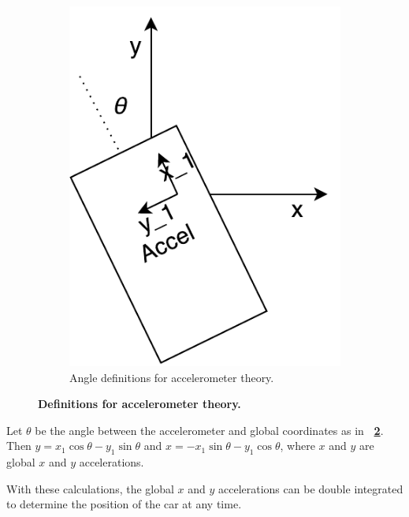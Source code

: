 \documentclass[letterpaper, 11pt]{article}
\newcommand*{\figref}[1]{\textbf{\figurename~\ref{#1}}}
\begin{document}
\begin{enumerate}[label=\textbf{\arabic*.}]
\begin{figure}[ht]
\begin{subfigure}[t]{0.48\textwidth}
        \includegraphics[height=0.4\textheight]{images/accel2.pdf}
        \caption{Angle definitions for accelerometer theory.}
        \label{fig:accel2}
    \end{subfigure}
    \caption{\textbf{Definitions for accelerometer theory.}}
\end{figure}

Let $\theta$ be the angle between the accelerometer and global coordinates as in \figref{fig:accel2}. Then $y = x_1\cos{\theta} - y_1\sin{\theta}$ and $x = -x_1\sin{\theta} - y_1\cos{\theta}$, where $x$ and $y$ are global $x$ and $y$ accelerations. 

With these calculations, the global $x$ and $y$ accelerations can be double integrated to determine the position of the car at any time.

\clearpage

\end{enumerate}
\end{document}
